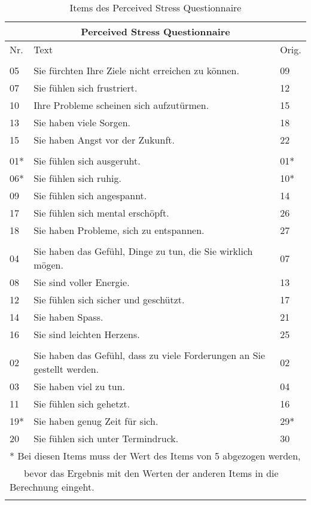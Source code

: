 
\begin{table}[htbp]
\begin{tabular}{|p{2em} | m{30em} | l|} 
  \hline
  \multicolumn{3}{|c|}{\textbf{Perceived Stress Questionnaire}}\\
  \hline
  Nr. & Text & Orig. \\ 
  \hline\hline
  \rowcolor{lightgray}
  \multicolumn{3}{|l|}{Sorgen (worries)}\\
  \hline
  05 & Sie fürchten Ihre Ziele nicht erreichen zu können. & 09\\
  07 & Sie fühlen sich frustriert. & 12\\
  10 & Ihre Probleme scheinen sich aufzutürmen. & 15\\
  13 & Sie haben viele Sorgen. & 18\\
  15 & Sie haben Angst vor der Zukunft. & 22\\
  \rowcolor{lightgray}
  \multicolumn{3}{|l|}{Anspannung (tension)}\\
  \hline
  01* & Sie fühlen sich ausgeruht. & 01*\\
  06* & Sie fühlen sich ruhig. & 10*\\
  09 & Sie fühlen sich angespannt. & 14\\
  17 & Sie fühlen sich mental erschöpft. & 26\\
  18 & Sie haben Probleme, sich zu entspannen. & 27\\
  \rowcolor{lightgray}
  \multicolumn{3}{|l|}{Freude (joy)}\\
  \hline
  04 & Sie haben das Gefühl, Dinge zu tun, die Sie wirklich mögen. & 07\\
  08 & Sie sind voller Energie. & 13\\
  12 & Sie fühlen sich sicher und geschützt. & 17\\
  14 & Sie haben Spass. & 21\\
  16 & Sie sind leichten Herzens. & 25\\
  \rowcolor{lightgray}
  \multicolumn{3}{|l|}{Anforderungen (demands)}\\
  \hline
  02 & Sie haben das Gefühl, dass zu viele Forderungen an Sie gestellt werden. & 02\\
  03 & Sie haben viel zu tun. & 04\\
  11 & Sie fühlen sich gehetzt. & 16\\
  19* & Sie haben genug Zeit für sich. & 29*\\
  20 & Sie fühlen sich unter Termindruck. & 30\\
  \hline
  \multicolumn{3}{l}{* Bei diesen Items muss der Wert des Items von 5 abgezogen werden,}\\
  \multicolumn{3}{l}{~~~bevor das Ergebnis mit den Werten der anderen Items in die Berechnung eingeht.}\\
  \multicolumn{3}{l}{}\\
\end{tabular}
\caption{Items des Perceived Stress Questionnaire}
\label{table:PSQ}
\end{table}